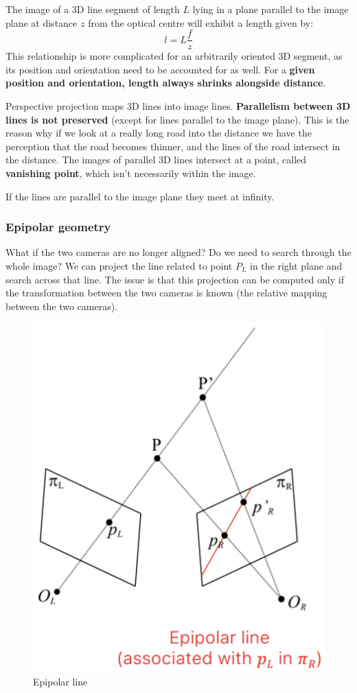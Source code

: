 \documentclass{article}
\begin{document}
The image of a 3D line segment of length $L$ lying in a plane parallel to the image plane at distance $z$ from the optical centre will exhibit a length given by:
$$l = L \frac{f}{z}$$
This relationship is more complicated for an arbitrarily oriented 3D segment, as its position and orientation need to be accounted for as well.
For a \textbf{given position and orientation, length always shrinks alongside distance}.

Perspective projection maps 3D lines into image lines.
\textbf{Parallelism between 3D lines is not preserved} (except for lines parallel to the image plane).
This is the reason why if we look at a really long road into the distance we have the perception that the road becomes thinner, and the lines of the road intersect in the distance.
The images of parallel 3D lines intersect at a point, called \textbf{vanishing point}, which isn't necessarily within the image.

If the lines are parallel to the image plane they meet at infinity.

\subsubsection{Epipolar geometry}

What if the two cameras are no longer aligned? Do we need to search through the whole image?
We can project the line related to point $P_L$ in the right plane and search across that line.
The issue is that this projection can be computed only if the transformation between the two cameras is known (the relative mapping between the two cameras).

\begin{figure}[htbp]
  \centering
  \includegraphics[width=0.45\linewidth]{./img/epipolar_line.jpg}
  \caption{Epipolar line}
  \label{fig:epipolar_line}
\end{figure}
\end{document}
